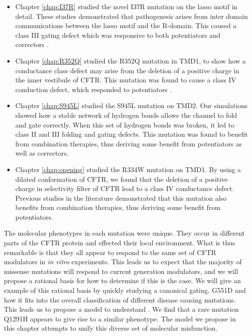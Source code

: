 
\begin{itemize}
	\item Chapter \ref{chap:I37R} studied the novel I37R mutation on the lasso motif in detail. These studies demonstrated that pathogenesis arises from inter domain communications between the lasso motif and the R-domain.  This caused a class III gating defect which was responsive to both potentiators and correctors \cite{wong2022}. 
	\item Chapter \ref{chap:R352Q} studied the R352Q mutation in TMD1, to show how a conductance class defect may arise from the deletion of a positive charge in the inner vestibule of CFTR. This mutation was found to cause a class IV conduction defect, which responded to potentiators \cite{wong2022a}.
\item Chapter \ref{chap:S945L} studied the S945L mutation on TMD2. Our simulations showed how a stable network of hydrogen bonds allows the channel to fold and gate correctly. When this set of hydrogen bonds was broken, it led to class II and III folding and gating defects. This mutation was found to benefit from combination therapies, thus deriving some benefit from potentiators as well as correctors.  
\item Chapter \ref{chap:opening} studied the R334W mutation on TMD1. By using a dilated conformation of CFTR, we found that the deletion of a positive charge in selectivity filter of CFTR lead to a class IV conductance defect. Previous studies in the literature demonstrated that this mutation also benefits from combination therapies, thus deriving some benefit from potentiators. 
\end{itemize}

The molecular phenotypes in each mutation were unique. They occur in different parts of the CFTR protein and effected their local environment. What is thus remarkable is that they all appear to respond to the same set of CFTR modulators in \textit{in vitro} experiments. This leads us to expect that the majority of missense mutations will respond to current generation modulators, and we will propose a rational basis for how to determine if this is the case. We will give an example of this rational basis by quickly studying a canonical gating, G551D and how it fits into the overall classification of different disease causing mutations. This leads us to propose a model to understand . We find that a rare mutation Q1291H appears to give rise to a similar phenotype. The model we propose in this chapter attempts to unify this diverse set of molecular misfunction.

